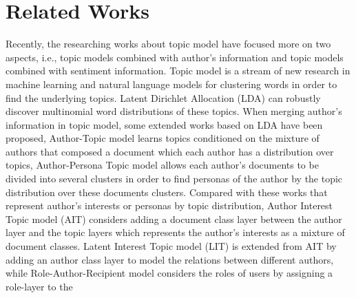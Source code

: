 \documentclass[twocolumn]{svjour3}          %
\begin{document}
\section{Related Works}
Recently, the researching works about topic model have focused more on two aspects, i.e., topic models combined with author’s information and topic models combined with sentiment information. Topic model is a stream of new research in machine learning and natural language models for clustering words in order to find the underlying topics. Latent Dirichlet Allocation (LDA) \cite{blei2003latent} can robustly discover multinomial word distributions of these topics. When merging author’s information in topic model, some extended works based on LDA have been proposed, Author-Topic model \cite{steyvers2004probabilistic} learns topics conditioned on the mixture of authors that composed a document which each author has a distribution over topics, Author-Persona Topic model \cite{mimno2007expertise} allows each author’s documents to be divided into several clusters in order to find personas of the author by the topic distribution over these documents clusters. Compared with these works that represent author’s interests or personas by topic distribution, Author Interest Topic model (AIT) \cite{kawamae2010author} considers adding a document class layer between the author layer and the topic layers which represents the author’s interests as a mixture of document classes. Latent Interest Topic model (LIT) \cite{kawamae2010latent} is extended from AIT by adding an author class layer to model the relations between different authors, while Role-Author-Recipient model \cite{mccallum2005topic} considers the roles of users by assigning a role-layer to the
\end{document}
